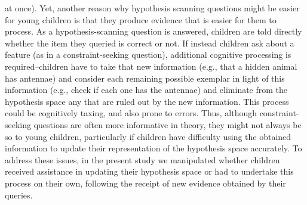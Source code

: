 \documentclass[man,floatsintext]{apa6}
\begin{document}
at once). Yet, another reason why hypothesis scanning questions might be easier for young children is that they produce evidence that is easier for them to process. As a hypothesis-scanning question is answered, children are told directly whether the item they queried is correct or not. If instead children ask about a feature (as in a constraint-seeking question), additional cognitive processing is required--children have to take that new information (e.g., that a hidden animal has antennae) and consider each remaining possible 
exemplar in light of this information (e.g., check if each one has the antennae) and eliminate from the 
hypothesis space any that are ruled out by the new information. This process could be cognitively taxing, 
and also prone to errors. Thus, although constraint-seeking questions are often more informative in 
theory, they might not always be so to young children, particularly if children have difficulty using the 
obtained information to update their representation of the hypothesis space accurately. To address 
these issues, in the present study we manipulated whether children received assistance in updating 
their hypothesis space or had to undertake this process on their own, following the receipt of new 
evidence obtained by their queries. 



\end{document}

